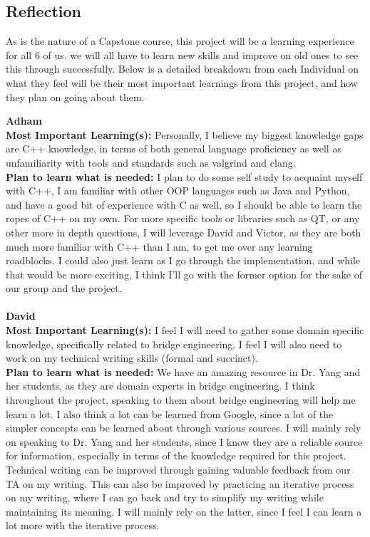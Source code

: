 \documentclass[12pt]{article}
\begin{document}
\subsection{Reflection}

As is the nature of a Capstone course, this project will be a learning experience for all 6 of us. we will all have to learn new skills and improve on old ones to see this 
through successfully. Below is a detailed breakdown from each Individual on what they feel will be their most important learnings from this project, and how they plan on
going about them.

\noindent\textbf{Adham}\\
\textbf{Most Important Learning(s):} Personally, I believe my biggest knowledge gaps are C++ knowledge, in terms of both general language proficiency as well as unfamiliarity
with tools and standards such as valgrind and clang.\\
\textbf{Plan to learn what is needed:} I plan to do some self study to acquaint myself with C++, I am familiar with other OOP languages such as Java and Python, and have a good
bit of experience with C as well, so I should be able to learn the ropes of C++ on my own. For more specific tools or libraries such as QT, or any other more in depth questions,
I will leverage David and Victor, as they are both much more familiar with C++ than I am, to get me over any learning roadblocks. I could also just learn as I go through the
implementation, and while that would be more exciting, I think I'll go with the former option for the sake of our group and the project.\\\\

\noindent\textbf{David}\\
\textbf{Most Important Learning(s):} I feel I will need to gather some domain specific knowledge, specifically related to bridge engineering. 
I feel I will also need to work on my technical writing skills (formal and succinct). \\
\textbf{Plan to learn what is needed:} We have an amazing resource in Dr. Yang and her students, as they are domain experts in bridge engineering. I think throughout the 
project, speaking to them about bridge engineering will help me learn a lot. I also think a lot can be learned from Google, since a lot of the simpler concepts can be learned 
about through various sources. I will mainly rely on speaking to Dr. Yang and her students, since I know they are a reliable source for information, especially in terms of 
the knowledge required for this project. Technical writing can be improved through gaining valuable feedback from our TA on my writing. This can also be improved
by practicing an iterative process on my writing, where I can go back and try to simplify my writing while maintaining its meaning. I will mainly rely on the latter, since 
I feel I can learn a lot more with the iterative process.\\\\
\end{document}
